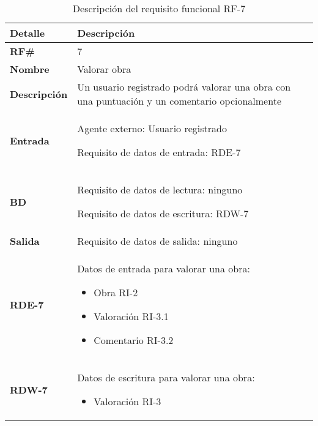 \begin{table}[H]
    \centering
    \begin{tabular}{|p{3cm}|p{8cm}|}
        \hline
        \rowcolor{lightgray}
        \textbf{Detalle} & \textbf{Descripción} \\
        \hline
        \textbf{RF\#} & 7 \\
        \hline
        \textbf{Nombre} & Valorar obra \\
        \hline
        \textbf{Descripción} & Un usuario registrado podrá valorar una obra con
        una puntuación y un comentario opcionalmente \\
        \hline
        \textbf{Entrada} &
        Agente externo: Usuario registrado
        
        Requisito de datos de entrada: RDE-7 \\
        \hline
        \textbf{BD} &
        Requisito de datos de lectura: ninguno
        
        Requisito de datos de escritura: RDW-7 \\
        \hline
        \textbf{Salida} & Requisito de datos de salida: ninguno \\
        \hline
        \textbf{RDE-7} & Datos de entrada para valorar una obra:
            \begin{itemize}
                \item Obra RI-2
                \item Valoración RI-3.1
                \item Comentario RI-3.2
            \end{itemize} \\
        \hline
        \textbf{RDW-7} & Datos de escritura para valorar una obra:
            \begin{itemize}
                \item Valoración RI-3
            \end{itemize} \\
        \hline
    \end{tabular}
    \caption{Descripción del requisito funcional RF-7}
    \label{tab:rf-7}
\end{table}

